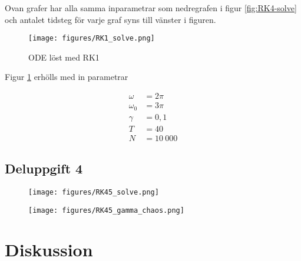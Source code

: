 \documentclass[12pt]{article}
\begin{document}
Ovan grafer har alla samma inparametrar som nedregrafen i figur \ref{fig:RK4-solve} och antalet tidsteg för varje graf syns till vänster i figuren.

\begin{figure}[H]
    \begin{small}
        \begin{center}
            \texttt{[image: figures/RK1\_solve.png]}
        \end{center}
        \caption{ODE löst med RK1}
        \label{fig:RK1-solve}
    \end{small}
\end{figure}

Figur \ref{fig:RK1-solve} erhölls med in parametrar

\begin{align*}
    \omega &= 2 \pi\\
    \omega_0 &= 3 \pi\\
    \gamma &= 0,1\\
    T &= 40\\
    N &= 10 \ 000
\end{align*}

\subsection{Deluppgift 4}

\begin{figure}[H]
    \begin{small}
        \begin{center}
            \texttt{[image: figures/RK45\_solve.png]}
        \end{center}
        \caption{}
        \label{fig:RK45-solve}
    \end{small}
\end{figure}



\begin{figure}[H]
    \begin{small}
        \begin{center}
            \texttt{[image: figures/RK45\_gamma\_chaos.png]}
        \end{center}
        \caption{}
        \label{fig:RK45-chaos}
    \end{small}
\end{figure}


\section{Diskussion}
\end{document}

